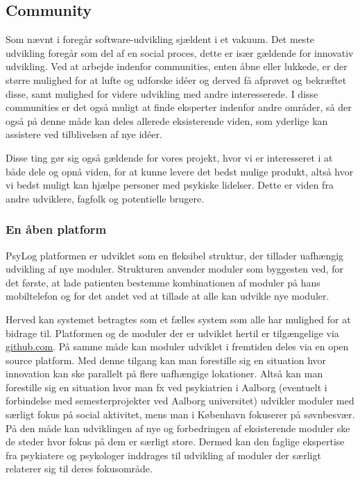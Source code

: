\subsection{Community}
Som nævnt i \citet[Kapitel 2]{book:softwareinnovation} foregår software-udvikling sjældent i et vakuum.
Det meste udvikling foregår som del af en social proces, dette er især gældende for innovativ udvikling.
Ved at arbejde indenfor communities, enten åbne eller lukkede, er der større mulighed for at lufte og udforske idéer og derved få afprøvet og bekræftet disse, samt mulighed for videre udvikling med andre interesserede.
I disse communities er det også muligt at finde eksperter indenfor andre områder, så der også på denne måde kan deles allerede eksisterende viden, som yderlige kan assistere ved tilblivelsen af nye idéer.

Disse ting gør sig også gældende for vores projekt, hvor vi er interesseret i at både dele og opnå viden, for at kunne levere det bedst mulige produkt, altså hvor vi bedst muligt kan hjælpe personer med psykiske lidelser.
Dette er viden fra andre udviklere, fagfolk og potentielle brugere.

\subsubsection{En åben platform}
PsyLog platformen er udviklet som en fleksibel struktur, der tillader uafhængig udvikling af nye moduler.
Strukturen anvender moduler som byggesten ved, for det første, at lade patienten bestemme kombinationen af moduler på hans mobiltelefon og for det andet ved at tillade at alle kan udvikle nye moduler.

Herved kan systemet betragtes som et fælles system som alle har mulighed for at bidrage til.
Platformen og de moduler der er udviklet hertil er tilgængelige via \href{http://github.com}{github.com}.
På samme måde kan moduler udviklet i fremtiden deles via en open source platform.
Med denne tilgang kan man forestille sig en situation hvor innovation kan ske parallelt på flere uafhængige lokationer.
Altså kan man forestille sig en situation hvor man fx ved psykiatrien i Aalborg (eventuelt i forbindelse med semesterprojekter ved Aalborg universitet) udvikler moduler med særligt fokus på social aktivitet, mens man i København fokuserer på søvnbesvær.
På den måde kan udviklingen af nye og forbedringen af eksisterende moduler ske de steder hvor fokus på dem er særligt store.
Dermed kan den faglige ekspertise fra psykiatere og psykologer inddrages til udvikling af moduler der særligt relaterer sig til deres fokusområde.

